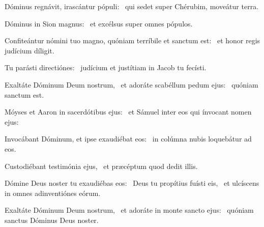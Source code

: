 \item Dóminus regnávit, irascántur pópuli:~\psstar{} qui sedet super Chérubim, moveátur terra.

\item Dóminus in Sion magnus:~\psstar{} et excélsus super omnes pópulos.

\item Confiteántur nómini tuo magno, quóniam terríbile et sanctum est:~\psstar{} et honor regis judícium díligit.

\item Tu parásti directiónes:~\psstar{} judícium et justítiam in Jacob tu fecísti.

\item Exaltáte Dóminum Deum nostrum,~\pscross{} et adoráte scabéllum pedum ejus:~\psstar{} quóniam sanctum est.

\item Móyses et Aaron in sacerdótibus ejus:~\psstar{} et Sámuel inter eos qui ínvocant nomen ejus:

\item Invocábant Dóminum, et ipse exaudiébat eos:~\psstar{} in colúmna nubis loquebátur ad eos.

\item Custodiébant testimónia ejus,~\psstar{} et præcéptum quod dedit illis.

\item Dómine Deus noster tu exaudiébas eos:~\pscross{} Deus tu propítius fuísti eis,~\psstar{} et ulcíscens in omnes adinventiónes eórum.

\item Exaltáte Dóminum Deum nostrum,~\pscross{} et adoráte in monte sancto ejus:~\psstar{} quóniam sanctus Dóminus Deus noster.
